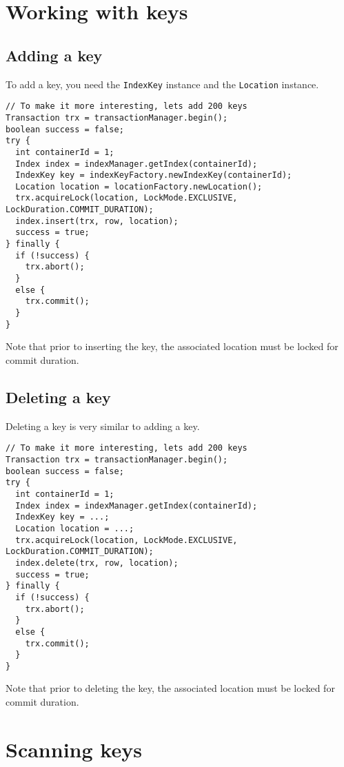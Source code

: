 \documentclass[a4paper,draft,oneside]{book}
\begin{document}
\section{Working with keys}

\subsection{Adding a key}

To add a key, you need the \verb|IndexKey| instance and the \verb|Location| instance.

\begin{verbatim}
// To make it more interesting, lets add 200 keys
Transaction trx = transactionManager.begin();
boolean success = false;
try {
  int containerId = 1;
  Index index = indexManager.getIndex(containerId);
  IndexKey key = indexKeyFactory.newIndexKey(containerId);
  Location location = locationFactory.newLocation();
  trx.acquireLock(location, LockMode.EXCLUSIVE, LockDuration.COMMIT_DURATION);
  index.insert(trx, row, location);
  success = true;
} finally {
  if (!success) {
    trx.abort();
  }
  else {
    trx.commit();
  }
}
\end{verbatim}

Note that prior to inserting the key, the associated location must be
locked for commit duration. 

\subsection{Deleting a key}

Deleting a key is very similar to adding a key.

\begin{verbatim}
// To make it more interesting, lets add 200 keys
Transaction trx = transactionManager.begin();
boolean success = false;
try {
  int containerId = 1;
  Index index = indexManager.getIndex(containerId);
  IndexKey key = ...;
  Location location = ...;
  trx.acquireLock(location, LockMode.EXCLUSIVE, LockDuration.COMMIT_DURATION);
  index.delete(trx, row, location);
  success = true;
} finally {
  if (!success) {
    trx.abort();
  }
  else {
    trx.commit();
  }
}
\end{verbatim}

Note that prior to deleting the key, the associated location must be
locked for commit duration. 

\section{Scanning keys}
\end{document}
